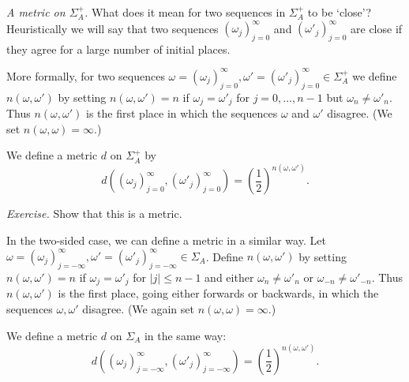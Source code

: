 \documentclass[12pt]{article}
\theoremstyle{definition}
\theoremstyle{remark}
\begin{document}
\medskip
\noindent
{\it A metric on $\Sigma_{A}^{+}$.}
What does it mean for two sequences in $\Sigma_{A}^{+}$ to be `close'?
Heuristically we will say that two sequences $(\omega_{j})_{j=0}^{\infty}$
and $(\omega'_{j})_{j=0}^{\infty}$ are close if they agree for a large
number of initial places.

More formally, for two sequences $\omega=(\omega_{j})_{j=0}^{\infty},
\omega'=(\omega'_{j})_{j=0}^{\infty} \in \Sigma_{A}^{+}$ we define
$n(\omega,\omega')$ by setting $n(\omega,\omega') = n$ if $\omega_{j}=\omega'_{j}$ for $j=0, \ldots, n-1$ but $\omega_{n} \not= \omega'_{n}$.  Thus $n(\omega,\omega')$ is the first place in which the sequences $\omega$ and $\omega'$ disagree.  (We set $n(\omega,\omega) =\infty$.)

We define a metric $d$ on $\Sigma_{A}^{+}$ by
\[
 d( (\omega_{j})_{j=0}^{\infty}, (\omega'_{j})_{j=0}^{\infty} ) = \left(
 \frac{1}{2} \right)^{n(\omega,\omega')}.
\]

\medskip
\noindent
{\it Exercise.}
Show that this is a metric.

\medskip

In the two-sided case, we can define a metric in a similar way.  Let  $\omega=(\omega_{j})_{j=-\infty}^{\infty},
\omega'=(\omega'_{j})_{j=-\infty}^{\infty} \in \Sigma_{A}$. 
Define $n(\omega,\omega')$ by setting $n(\omega,\omega') =n$ if $\omega_{j} = \omega'_{j}$ for $|j| \leq n-1$ and either $\omega_{n} \not= \omega'_{n}$ or $\omega_{-n} \not= \omega'_{-n}$.  Thus $n(\omega,\omega')$ is the first place, going either forwards or backwards, in which the sequences $\omega,\omega'$ disagree.  (We again set $n(\omega,\omega)=\infty$.)

We define a metric $d$ on $\Sigma_{A}$ in the same way:
\[
 d( (\omega_{j})_{j=-\infty}^{\infty}, (\omega'_{j})_{j=-\infty}^{\infty} ) =
 \left( \frac{1}{2} \right)^{n(\omega,\omega')}.
\]
\end{document}
